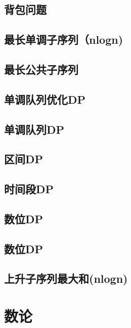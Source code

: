 \section{背包问题}
\raggedbottom
\hrulefill
\section{最长单调子序列（nlogn)}
\raggedbottom
\hrulefill
\section{最长公共子序列}
\raggedbottom
\hrulefill
\section{单调队列优化DP}
\raggedbottom
\hrulefill
\section{单调队列DP}
\raggedbottom
\hrulefill
\section{区间DP}
\raggedbottom
\hrulefill
\section{时间段DP}
\raggedbottom
\hrulefill
\section{数位DP}
\raggedbottom
\hrulefill
\section{数位DP}
\raggedbottom
\hrulefill
\section{上升子序列最大和(nlogn)}
\raggedbottom
\hrulefill

\chapter{数论}
